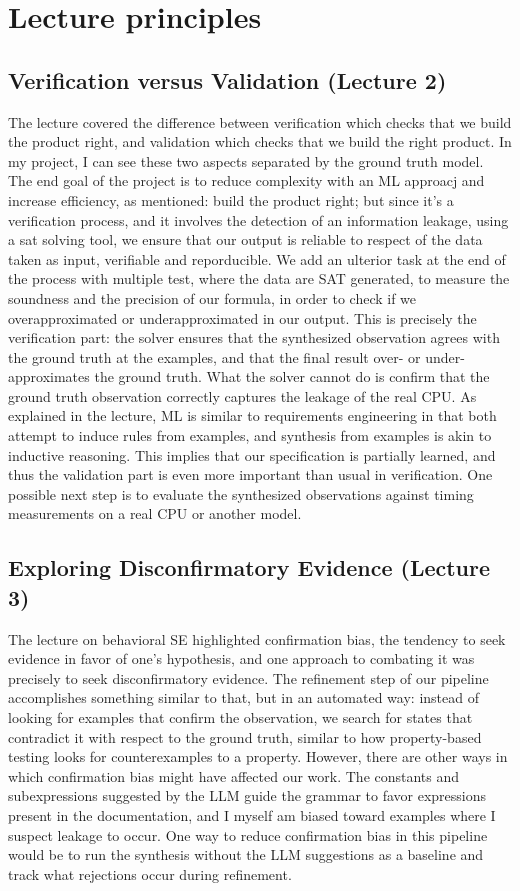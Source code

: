 \documentclass[11pt]{article}
\begin{document}
\section{Lecture principles}
\subsection{Verification versus Validation (Lecture 2)}The lecture covered the difference between verification which checks that we build the product right, and validation which checks that we build the right product. In my project, I can see these two aspects separated by the ground truth model.
The end goal of the project is to reduce complexity with an ML approacj and increase efficiency, as mentioned: build the product right; but since it's a verification process, and it involves the detection of an information leakage, using a sat solving tool, we ensure that our output is reliable to respect of the data taken as input, verifiable and reporducible.
We add an ulterior task at the end of the process with multiple test, where the data are SAT generated, to measure the soundness and the precision of our formula, in order to check if we overapproximated or underapproximated in our output.
This is precisely the verification part: the solver ensures that the synthesized observation agrees with the ground truth at the examples, and that the final result over- or under-approximates the ground truth. What the solver cannot do is confirm that the ground truth observation correctly captures the leakage of the real CPU. As explained in the lecture, ML is similar to requirements engineering in that both attempt to induce rules from examples, and synthesis from examples is akin to inductive reasoning. This implies that our specification is partially learned, and thus the validation part is even more important than usual in verification. One possible next step is to evaluate the synthesized observations against timing measurements on a real CPU or another model.

\subsection{Exploring Disconfirmatory Evidence (Lecture 3)}

The lecture on behavioral SE highlighted confirmation bias, the tendency to seek evidence in favor of one's hypothesis, and one approach to combating it was precisely to seek disconfirmatory evidence. The refinement step of our pipeline accomplishes something similar to that, but in an automated way: instead of looking for examples that confirm the observation, we search for states that contradict it with respect to the ground truth, similar to how property-based testing looks for counterexamples to a property. However, there are other ways in which confirmation bias might have affected our work. The constants and subexpressions suggested by the LLM guide the grammar to favor expressions present in the documentation, and I myself am biased toward examples where I suspect leakage to occur. One way to reduce confirmation bias in this pipeline would be to run the synthesis without the LLM suggestions as a baseline and track what rejections occur during refinement.
\end{document}
